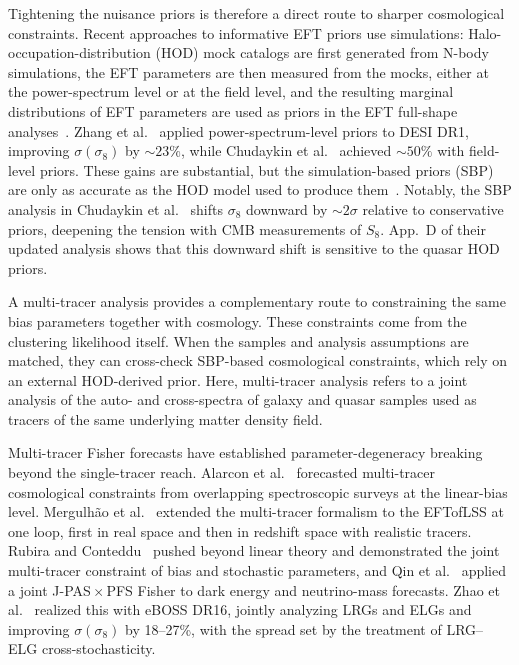 \documentclass[a4paper,11pt]{article}
\newcommand{\revchange}[1]{{\color{RevisionColor}#1}}
\newcommand{\se}{\ensuremath{\sigma_{8}}\xspace}
\begin{document}
Tightening the nuisance priors is therefore a direct route to sharper
cosmological constraints. \revchange{Recent approaches to informative EFT
priors use simulations: Halo-occupation-distribution (HOD)} mock catalogs are first generated
from N-body simulations, the EFT parameters are then measured from the
mocks, either at the power-spectrum level or at the field
level, and the resulting marginal distributions of EFT parameters are used as priors in the EFT full-shape analyses~\cite{Ivanov:2024hgq,Ivanov:2024xgb,Zhang:2024thl}.
Zhang et al.~\cite{DESI:2025wzd} applied power-spectrum-level priors to DESI DR1, improving $\sigma(\se)$ by $\sim\!23\%$\revchange{, while
Chudaykin et al.}~\cite{Chudaykin:2026nls} achieved
$\sim\!50\%$ with field-level priors.
These gains are substantial, but the simulation-based priors (SBP) are only as accurate as the HOD model used to produce them~\cite{Akitsu:2024lyt}.
Notably, the SBP analysis in Chudaykin et al.~\cite{Chudaykin:2026nls} shifts $\se$ downward by $\sim\!2\sigma$ relative to conservative
priors, deepening the tension with CMB
measurements of $S_8$.
\revchange{App.~D of their updated analysis shows that this downward shift is sensitive to the quasar HOD priors.}

\revchange{A multi-tracer analysis provides a complementary route to constraining the same bias
parameters together with cosmology. These constraints come from the
clustering likelihood itself. When the samples and analysis assumptions
are matched, they can cross-check SBP-based cosmological constraints,
which rely on an external HOD-derived prior.
Here, multi-tracer analysis refers to a joint analysis of the auto- and cross-spectra of galaxy and quasar samples used as tracers of
the same underlying matter density field.}

Multi-tracer Fisher forecasts have established parameter-degeneracy breaking beyond the single-tracer reach. \revchange{Alarcon et al.}~\cite{Alarcon:2016bkr} forecasted multi-tracer cosmological constraints from overlapping spectroscopic surveys at the linear-bias level. Mergulhão et al.~\cite{Mergulhao:2021kip,Mergulhao:2023zso} extended the multi-tracer formalism to the EFTofLSS at one loop, first in real space and then in redshift space with realistic tracers.
Rubira and Conteddu~\cite{Rubira:2025scu} pushed beyond linear theory and demonstrated the joint multi-tracer constraint of bias and stochastic parameters, and Qin et al.~\cite{Qin:2025nkk} applied a joint J-PAS\,$\times$\,PFS Fisher to dark energy and neutrino-mass forecasts.
Zhao et al.~\cite{Zhao:2024eboss} realized this with eBOSS DR16, jointly analyzing LRGs and ELGs and improving $\sigma(\se)$ by 18--27\%, with the spread set by the treatment of LRG--ELG cross-stochasticity.
\end{document}
